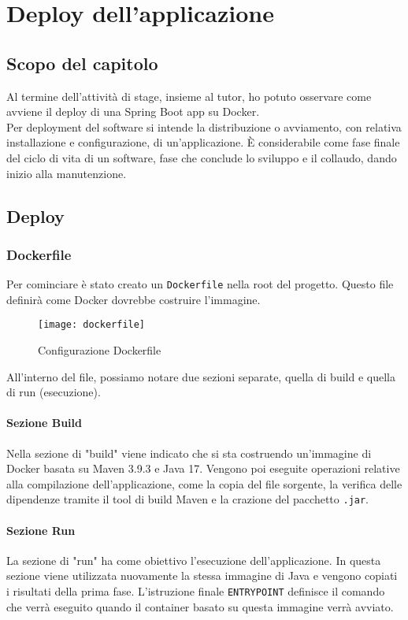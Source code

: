 \chapter{Deploy dell'applicazione}
\label{cap:deploy}
\section{Scopo del capitolo}
Al termine dell'attività di stage, insieme al tutor, ho potuto osservare come avviene il deploy di una Spring Boot app su Docker.\\
Per deployment del software si intende la distribuzione o avviamento, con relativa installazione e configurazione, di un'applicazione. È considerabile come fase finale del ciclo di vita di un software, fase che conclude lo sviluppo e il collaudo, dando inizio alla manutenzione.
\section{Deploy}
\subsection{Dockerfile}
Per cominciare è stato creato un \texttt{Dockerfile} nella root del progetto. Questo file definirà come Docker dovrebbe costruire l'immagine.
\begin{figure}[H] 
    \centering 
    \texttt{[image: dockerfile]} 
    \caption{Configurazione Dockerfile}
\end{figure}
\noindent All'interno del file, possiamo notare due sezioni separate, quella di build e quella di run (esecuzione).
\subsubsection*{Sezione Build}
Nella sezione di "build" viene indicato che si sta costruendo un'immagine di Docker basata su Maven 3.9.3 e Java 17. Vengono poi eseguite operazioni relative alla compilazione dell'applicazione, come la copia del file sorgente, la verifica delle dipendenze tramite il tool di build Maven e la crazione del pacchetto \texttt{.jar}.
\subsubsection*{Sezione Run}
La sezione di "run" ha come obiettivo l'esecuzione dell'applicazione. In questa sezione viene utilizzata nuovamente la stessa immagine di Java e vengono copiati i risultati della prima fase. L'istruzione finale \texttt{ENTRYPOINT} definisce il comando che verrà eseguito quando il container basato su questa immagine verrà avviato.
